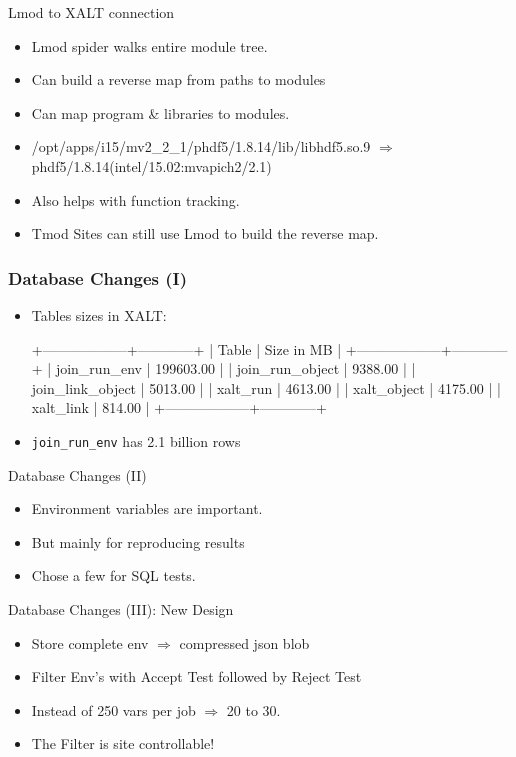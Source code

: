 \documentclass{beamer}
\begin{document}
\begin{frame}{Lmod to XALT connection}
  \begin{itemize}
    \item Lmod spider walks entire module tree.
    \item Can build a reverse map from paths to modules
    \item Can map program \& libraries to modules.
    \item /opt/apps/i15/mv2\_2\_1/phdf5/1.8.14/lib/libhdf5.so.9
      $\Rightarrow$ phdf5/1.8.14(intel/15.02:mvapich2/2.1)
    \item Also helps with function tracking.
    \item Tmod Sites can still use Lmod to build the reverse map.
  \end{itemize}
\end{frame}

\begin{frame}[fragile]
    \frametitle{Database Changes (I)}
  \begin{itemize}
      \item Tables sizes in XALT:
 {\small
    \begin{semiverbatim}
+------------------+------------+
| Table            | Size in MB |
+------------------+------------+
| join\_run\_env     |  199603.00 |
| join\_run\_object  |    9388.00 |
| join\_link\_object |    5013.00 |
| xalt\_run         |    4613.00 |
| xalt\_object      |    4175.00 |
| xalt\_link        |     814.00 |
+------------------+------------+
    \end{semiverbatim}
}
    \item \texttt{join\_run\_env} has 2.1 billion rows
  \end{itemize}
\end{frame}

\begin{frame}{Database Changes (II)}
  \begin{itemize}
    \item Environment variables are important.
    \item But mainly for reproducing results
    \item Chose a few for SQL tests.
  \end{itemize}
\end{frame}

\begin{frame}{Database Changes (III): New Design}
  \begin{itemize}
    \item Store complete env $\Rightarrow$ compressed json blob
    \item Filter Env's with Accept Test followed by Reject Test
    \item Instead of 250 vars per job $\Rightarrow$ 20 to 30.
    \item The Filter is site controllable!
  \end{itemize}
\end{frame}
\end{document}
